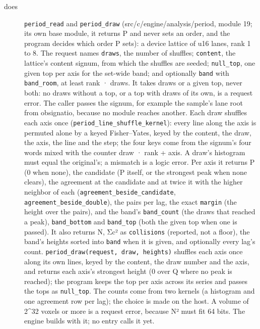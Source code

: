 \begin{description}
\item[{does}] \texttt{period\_\allowbreak{}read} and \texttt{period\_\allowbreak{}draw} (src/c/engine/analysis/period, module 19; its own base module, it returns P and never sets an order, and the program decides which order P sets): a device lattice of u16 lanes, rank 1 to 8. The request names \texttt{draws}, the number of shuffles; \texttt{content}, the lattice's content signum, from which the shuffles are seeded; \texttt{null\_\allowbreak{}top}, one given top per axis for the set-wide band; and optionally \texttt{band} with \texttt{band\_\allowbreak{}room}, at least rank · draws. It takes draws or a given top, never both: no draws without a top, or a top with draws of its own, is a request error. The caller passes the signum, for example the sample's lane root from obsignatio, because no module reaches another. Each draw shuffles each axis once (\texttt{period\_\allowbreak{}line\_\allowbreak{}shuffle\_\allowbreak{}kernel}): every line along the axis is permuted alone by a keyed Fisher–Yates, keyed by the content, the draw, the axis, the line and the step; the four keys come from the signum's four words mixed with the counter draw · rank + axis. A draw's histogram must equal the original's; a mismatch is a logic error. Per axis it returns P (0 when none), the candidate (P itself, or the strongest peak when none clears), the agreement at the candidate and at twice it with the higher neighbor of each (\texttt{agreement\_\allowbreak{}beside\_\allowbreak{}candidate}, \texttt{agreement\_\allowbreak{}beside\_\allowbreak{}double}), the pairs per lag, the exact \texttt{margin} (the height over the pairs), and the band's \texttt{band\_\allowbreak{}count} (the draws that reached a peak), \texttt{band\_\allowbreak{}bottom} and \texttt{band\_\allowbreak{}top} (both the given top when one is passed). It also returns N, Σc² as \texttt{collisions} (reported, not a floor), the band's heights sorted into \texttt{band} when it is given, and optionally every lag's count. \texttt{period\_\allowbreak{}draw(request, draw, heights)} shuffles each axis once along its own lines, keyed by the content, the draw number and the axis, and returns each axis's strongest height (0 over Q where no peak is reached); the program keeps the top per axis across its series and passes the tops as \texttt{null\_\allowbreak{}top}. The counts come from two kernels (a histogram and one agreement row per lag); the choice is made on the host. A volume of 2\textasciicircum{}32 voxels or more is a request error, because N² must fit 64 bits. The engine builds with it; no entry calls it yet.

\end{description}
